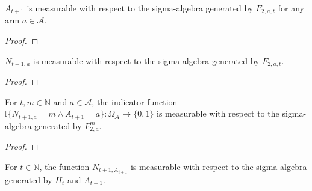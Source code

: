 \begin{lemma}\label{lem:AM.measurable_action_add_one_truePast}
  \leanok
$A_{t+1}$ is measurable with respect to the sigma-algebra generated by $F_{2, a, t}$ for any arm $a \in \mathcal{A}$.
\end{lemma}

\begin{proof}\leanok

\end{proof}


\begin{lemma}\label{lem:AM.measurable_pullCount_add_one_truePast}
  \leanok
$N_{t+1,a}$ is measurable with respect to the sigma-algebra generated by $F_{2, a, t}$.
\end{lemma}

\begin{proof}\leanok

\end{proof}


\begin{lemma}\label{lem:AM.measurable_stepsUntil}
\leanok
For $t, m \in \mathbb{N}$ and $a \in \mathcal{A}$, the indicator function $\mathbb{I}\{N_{t+1,a} = m \wedge A_{t+1} = a\} : \Omega_{\mathcal{A}} \to \{0, 1\}$ is measurable with respect to the sigma-algebra generated by $F_{2, a}^m$.
\end{lemma}

\begin{proof}\leanok

\end{proof}


\begin{lemma}\label{lem:AM.measurable_pullCount_action_add_one_hist}
\leanok
For $t \in \mathbb{N}$, the function $N_{t+1, A_{t+1}}$ is measurable with respect to the sigma-algebra generated by $H_t$ and $A_{t+1}$.
\end{lemma}

